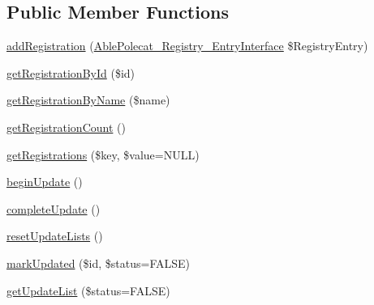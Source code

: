 \subsection*{Public Member Functions}
\begin{DoxyCompactItemize}
\item 
\hyperlink{interface_able_polecat___registry_interface_a22d8ddb551ccf544f1d2615db68ca9b1}{add\+Registration} (\hyperlink{interface_able_polecat___registry___entry_interface}{Able\+Polecat\+\_\+\+Registry\+\_\+\+Entry\+Interface} \$Registry\+Entry)
\item 
\hyperlink{interface_able_polecat___registry_interface_a06a999816a4143bb407c09628018a874}{get\+Registration\+By\+Id} (\$id)
\item 
\hyperlink{interface_able_polecat___registry_interface_a11594a43c95ab62b4841717c17cf0e54}{get\+Registration\+By\+Name} (\$name)
\item 
\hyperlink{interface_able_polecat___registry_interface_a4f5b90c7731c81b66bf67d79dad5dfc7}{get\+Registration\+Count} ()
\item 
\hyperlink{interface_able_polecat___registry_interface_a6f24c4ddef3e1c5dde4933e817fc5b4b}{get\+Registrations} (\$key, \$value=N\+U\+L\+L)
\item 
\hyperlink{interface_able_polecat___registry_interface_aa8c0a38f257c8ebb59f24f38bdb12419}{begin\+Update} ()
\item 
\hyperlink{interface_able_polecat___registry_interface_a363ee22699ad46520333ef24f64798bb}{complete\+Update} ()
\item 
\hyperlink{interface_able_polecat___registry_interface_ac91aa5a1d02834beeb440a94d33c6072}{reset\+Update\+Lists} ()
\item 
\hyperlink{interface_able_polecat___registry_interface_ab2683892f307a0f42eb0d869edfe5349}{mark\+Updated} (\$id, \$status=F\+A\+L\+S\+E)
\item 
\hyperlink{interface_able_polecat___registry_interface_aae89a4ca38c78f2001b1b80de35b8f50}{get\+Update\+List} (\$status=F\+A\+L\+S\+E)
\end{DoxyCompactItemize}
